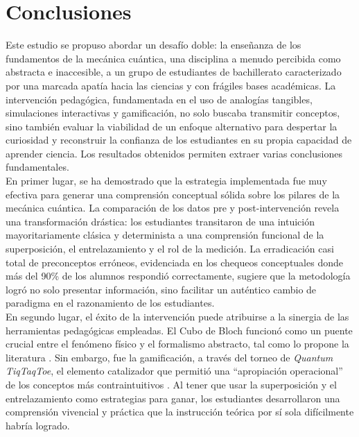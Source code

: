 \documentclass[10pt,a4paper]{article}
\begin{document}
\newpage

\section{Conclusiones}
\label{sec:conclusiones}

Este estudio se propuso abordar un desafío doble: la enseñanza de los fundamentos de la mecánica cuántica, una disciplina a menudo percibida como abstracta e inaccesible, a un grupo de estudiantes de bachillerato caracterizado por una marcada apatía hacia las ciencias y con frágiles bases académicas. La intervención pedagógica, fundamentada en el uso de analogías tangibles, simulaciones interactivas y gamificación, no solo buscaba transmitir conceptos, sino también evaluar la viabilidad de un enfoque alternativo para despertar la curiosidad y reconstruir la confianza de los estudiantes en su propia capacidad de aprender ciencia. Los resultados obtenidos permiten extraer varias conclusiones fundamentales.\\
\vspace{1em}
En primer lugar, se ha demostrado que la estrategia implementada fue muy efectiva para generar una comprensión conceptual sólida sobre los pilares de la mecánica cuántica. La comparación de los datos pre y post-intervención revela una transformación drástica: los estudiantes transitaron de una intuición mayoritariamente clásica y determinista a una comprensión funcional de la superposición, el entrelazamiento y el rol de la medición. La erradicación casi total de preconceptos erróneos, evidenciada en los chequeos conceptuales donde más del 90\% de los alumnos respondió correctamente, sugiere que la metodología logró no solo presentar información, sino facilitar un auténtico cambio de paradigma en el razonamiento de los estudiantes.\\
\vspace{1em}
En segundo lugar, el éxito de la intervención puede atribuirse a la sinergia de las herramientas pedagógicas empleadas. El Cubo de Bloch funcionó como un puente crucial entre el fenómeno físico y el formalismo abstracto, tal como lo propone la literatura \cite{TeachingQuantumFormalism2024}. Sin embargo, fue la gamificación, a través del torneo de \textit{Quantum TiqTaqToe}, el elemento catalizador que permitió una ``apropiación operacional'' de los conceptos más contraintuitivos \cite{GamesForTeaching2022}. Al tener que usar la superposición y el entrelazamiento como estrategias para ganar, los estudiantes desarrollaron una comprensión vivencial y práctica que la instrucción teórica por sí sola difícilmente habría logrado.\\
\end{document}

